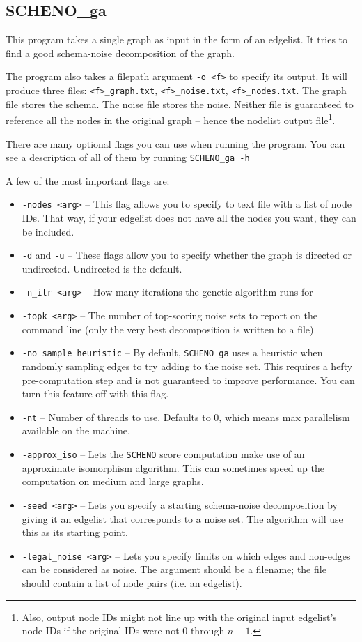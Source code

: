 \documentclass{article}
\begin{document}
\subsection{SCHENO\_ga}

This program takes a single graph as input in the form of an edgelist. It tries to find a good schema-noise decomposition of the graph.

The program also takes a filepath argument \verb|-o <f>| to specify its output. It will produce three files: \verb|<f>_graph.txt|, \verb|<f>_noise.txt|, \verb|<f>_nodes.txt|. The graph file stores the schema. The noise file stores the noise. Neither file is guaranteed to reference all the nodes in the original graph -- hence the nodelist output file\footnote{Also, output node IDs might not line up with the original input edgelist's node IDs if the original IDs were not 0 through $n - 1$.}.

There are many optional flags you can use when running the program. You can see a description of all of them by running \verb|SCHENO_ga -h|

A few of the most important flags are:

\begin{itemize}
    \item \verb|-nodes <arg>| -- This flag allows you to specify to text file with a list of node IDs. That way, if your edgelist does not have all the nodes you want, they can be included.
    \item \verb|-d| and \verb|-u| -- These flags allow you to specify whether the graph is directed or undirected. Undirected is the default.
    \item \verb|-n_itr <arg>| -- How many iterations the genetic algorithm runs for
    \item \verb|-topk <arg>| -- The number of top-scoring noise sets to report on the command line (only the very best decomposition is written to a file)
    \item \verb|-no_sample_heuristic| -- By default, \verb|SCHENO_ga| uses a heuristic when randomly sampling edges to try adding to the noise set. This requires a hefty pre-computation step and is not guaranteed to improve performance. You can turn this feature off with this flag.
    \item \verb|-nt| -- Number of threads to use. Defaults to 0, which means max parallelism available on the machine.
    \item \verb|-approx_iso| -- Lets the \verb|SCHENO| score computation make use of an approximate isomorphism algorithm. This can sometimes speed up the computation on medium and large graphs.
    \item \verb|-seed <arg>| -- Lets you specify a starting schema-noise decomposition by giving it an edgelist that corresponds to a noise set. The algorithm will use this as its starting point.
    \item \verb|-legal_noise <arg>| -- Lets you specify limits on which edges and non-edges can be considered as noise. The argument should be a filename; the file should contain a list of node pairs (i.e. an edgelist).
\end{itemize}
\end{document}
